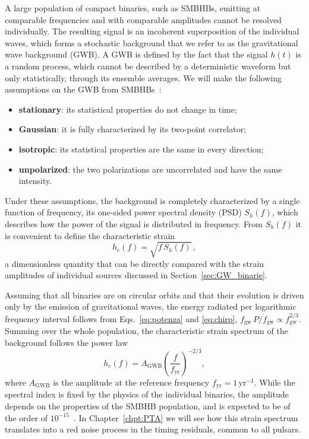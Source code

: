 A large population of compact binaries, such as SMBHBs, emitting at comparable
frequencies and with comparable amplitudes cannot be resolved individually.
The resulting signal is an incoherent superposition of the individual waves,
which forms a stochastic background that we refer to as the gravitational
wave background (GWB).
A GWB is defined by the fact that the
signal $h(t)$ is a random process, which cannot be described by a
deterministic waveform but only statistically, through its ensemble averages.
We will make the following assumptions on the GWB from SMBHBs~\cite{Maggiore2008}:
\begin{itemize}
    \item \textbf{stationary}: its statistical properties do not change in time;
    \item \textbf{Gaussian}: it is fully characterized by its two-point correlator;
    \item \textbf{isotropic}: its statistical properties are the same in every direction;
    \item \textbf{unpolarized}: the two polarizations are uncorrelated and have the same intensity.
\end{itemize}

Under these assumptions, the background is completely characterized by a
single function of frequency, its one-sided power spectral density (PSD)
$S_h(f)$, which describes how the power of the signal is distributed in
frequency. From $S_h(f)$ it is convenient to define the characteristic strain~\cite{Taylor2021}
\begin{equation}
    h_c(f) = \sqrt{f\,S_h(f)}\,,
    \label{eq:hc}
\end{equation}
a dimensionless quantity that can be directly compared with the strain
amplitudes of individual sources discussed in Section~\ref{sec:GW_binarie}.

Assuming that all binaries are on circular orbits and that their evolution is
driven only by the emission of gravitational waves, the energy radiated per
logarithmic frequency interval follows from Eqs.~\eqref{eq:potenza} and
\eqref{eq:chirp}, \mbox{$f_{\mathrm{gw}}\,P/\dot f_{\mathrm{gw}} \propto f_{\mathrm{gw}}^{2/3}$}. Summing over the whole
population, the characteristic strain spectrum of the background follows the
power law~\cite{Phinney2001,Taylor2021}
\begin{equation}
    h_c(f) = A_{\mathrm{GWB}} \left(\frac{f}{f_{\mathrm{yr}}}\right)^{-2/3} ,
    \label{eq:hc_powerlaw}
\end{equation}
where $A_{\mathrm{GWB}}$ is the amplitude at the reference frequency
$f_{\mathrm{yr}} = 1\,\mathrm{yr}^{-1}$. While the spectral index is fixed by
the physics of the individual binaries, the amplitude depends on the properties
of the SMBHB population, and is expected to be of the order of $10^{-15}$~\cite{EPTA2023_GWB,NANOGrav2023,PPTA2023,CPTA2023}.
In Chapter~\ref{chpt:PTA} we will see how this strain spectrum translates into
a red noise process in the timing residuals, common to all pulsars.